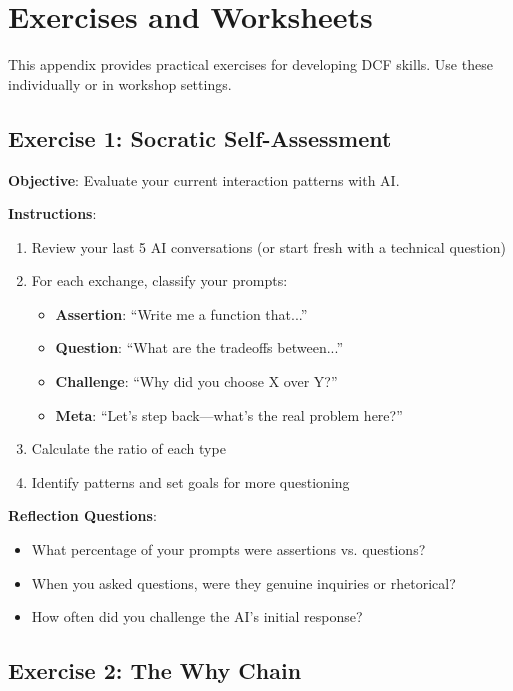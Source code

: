 \chapter{Exercises and Worksheets}

This appendix provides practical exercises for developing DCF skills. Use these individually or in workshop settings.

\section{Exercise 1: Socratic Self-Assessment}

\textbf{Objective}: Evaluate your current interaction patterns with AI.

\textbf{Instructions}:
\begin{enumerate}
    \item Review your last 5 AI conversations (or start fresh with a technical question)
    \item For each exchange, classify your prompts:
    \begin{itemize}
        \item \textbf{Assertion}: ``Write me a function that...''
        \item \textbf{Question}: ``What are the tradeoffs between...''
        \item \textbf{Challenge}: ``Why did you choose X over Y?''
        \item \textbf{Meta}: ``Let's step back---what's the real problem here?''
    \end{itemize}
    \item Calculate the ratio of each type
    \item Identify patterns and set goals for more questioning
\end{enumerate}

\textbf{Reflection Questions}:
\begin{itemize}
    \item What percentage of your prompts were assertions vs. questions?
    \item When you asked questions, were they genuine inquiries or rhetorical?
    \item How often did you challenge the AI's initial response?
\end{itemize}

\section{Exercise 2: The Why Chain}

